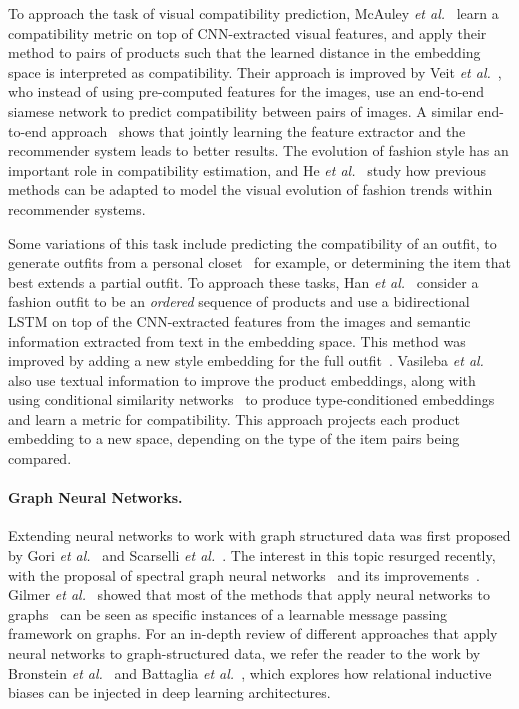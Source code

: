 \documentclass[10pt,twocolumn,letterpaper]{article}
\begin{document}
To approach the task of visual compatibility prediction, McAuley \emph{et al.}~\cite{mcauley2015image} learn a compatibility metric on top of CNN-extracted visual features, and apply their method to pairs of products such that the learned distance in the embedding space is interpreted as compatibility. Their approach is improved by Veit \emph{et al.}~\cite{veit2015learning}, who instead of using pre-computed features for the images, use an end-to-end siamese network to predict compatibility between pairs of images. A similar end-to-end approach~\cite{kang2017visually} shows that jointly learning the feature extractor and the recommender system leads to better results. The evolution of fashion style has an important role in compatibility estimation, and He \emph{et al.}~\cite{he2016ups} study how previous methods can be adapted to model the visual evolution of fashion trends within recommender systems.

Some variations of this task include predicting the compatibility of an outfit, to generate outfits from a personal closet~\cite{tangseng2017recommending} for example, or determining the item that best extends a partial outfit. To approach these tasks, Han \emph{et al.}~\cite{han2017learning} consider a fashion outfit to be an \emph{ordered} sequence of products and use a bidirectional LSTM on top of the CNN-extracted features from the images and semantic information extracted from text in the embedding space. This method was improved by adding a new style embedding for the full outfit~\cite{nakamura2018outfit}. Vasileba \emph{et al.}~\cite{vasileva2018learning} also use textual information to improve the product embeddings, along with using conditional similarity networks~\cite{veit2017conditional} to produce type-conditioned embeddings and learn a metric for compatibility. This approach projects each product embedding to a new space, depending on the type of the item pairs being compared. 

\paragraph{Graph Neural Networks.} Extending neural networks to work with graph structured data was first proposed by Gori \emph{et al.}~\cite{gori2005new} and Scarselli \emph{et al.}~\cite{scarselli2009graph}. The interest in this topic resurged recently, with the proposal of spectral graph neural networks~\cite{bruna2013spectral} and its improvements~\cite{defferrard2016convolutional, kipf2016semi}. 
Gilmer \emph{et al.}~\cite{gilmer2017neural} showed that most of the methods that apply neural networks to graphs~\cite{monti2017geometric, velickovic2017graph, hamilton2017inductive} can be seen as specific instances of a learnable message passing framework on graphs. For an in-depth review of different approaches that apply neural networks to graph-structured data, we refer the reader to the work by Bronstein \emph{et al.}~\cite{bronstein2017geometric} and Battaglia \emph{et al.}~\cite{battaglia2018relational}, which explores how relational inductive biases can be injected in deep learning architectures. 
\end{document}
